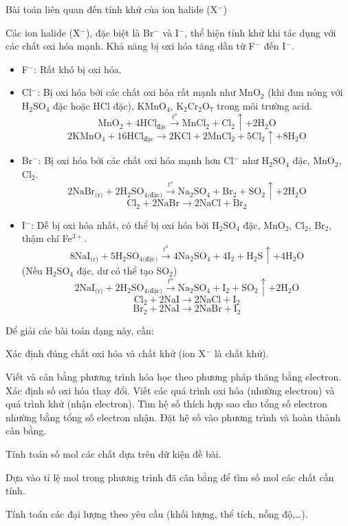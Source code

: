 \documentclass[Main.tex]{subfiles}
\begin{document}
 \begin{dang}{Bài toán liên quan đến tính khử của ion halide (X$^-$)}\end{dang}
   	\begin{phuongphap}
   		Các ion halide (X$^-$), đặc biệt là Br$^-$ và I$^-$, thể hiện tính khử khi tác dụng với các chất oxi hóa mạnh. Khả năng bị oxi hóa tăng dần từ F$^-$ đến I$^-$.
   		\begin{itemize}
   			\item F$^-$: Rất khó bị oxi hóa.
   			\item Cl$^-$: Bị oxi hóa bởi các chất oxi hóa rất mạnh như MnO$_2$ (khi đun nóng với H$_2$SO$_4$ đặc hoặc HCl đặc), KMnO$_4$, K$_2$Cr$_2$O$_7$ trong môi trường acid.
   			\[ \text{MnO}_2 + 4\text{HCl}_{\text{đặc}} \xrightarrow{t^o} \text{MnCl}_2 + \text{Cl}_2 \uparrow + 2\text{H}_2\text{O} \]
   			\[ 2\text{KMnO}_4 + 16\text{HCl}_{\text{đặc}} \rightarrow 2\text{KCl} + 2\text{MnCl}_2 + 5\text{Cl}_2 \uparrow + 8\text{H}_2\text{O} \]
   			\item Br$^-$: Bị oxi hóa bởi các chất oxi hóa mạnh hơn Cl$^-$ như H$_2$SO$_4$ đặc, MnO$_2$, Cl$_2$.
   			\[ 2\text{NaBr}_{\text{(r)}} + 2\text{H}_2\text{SO}_{4\text{(đặc)}} \xrightarrow{t^o} \text{Na}_2\text{SO}_4 + \text{Br}_2 + \text{SO}_2 \uparrow + 2\text{H}_2\text{O} \]
   			\[ \text{Cl}_2 + 2\text{NaBr} \rightarrow 2\text{NaCl} + \text{Br}_2 \]
   			\item I$^-$: Dễ bị oxi hóa nhất, có thể bị oxi hóa bởi H$_2$SO$_4$ đặc, MnO$_2$, Cl$_2$, Br$_2$, thậm chí Fe$^{3+}$.
   			\[ 8\text{NaI}_{\text{(r)}} + 5\text{H}_2\text{SO}_{4\text{(đặc)}} \xrightarrow{t^o} 4\text{Na}_2\text{SO}_4 + 4\text{I}_2 + \text{H}_2\text{S} \uparrow + 4\text{H}_2\text{O} \]
   			(Nếu H$_2$SO$_4$ đặc, dư có thể tạo SO$_2$)
   			\[ 2\text{NaI}_{\text{(r)}} + 2\text{H}_2\text{SO}_{4\text{(đặc)}} \xrightarrow{t^o} \text{Na}_2\text{SO}_4 + \text{I}_2 + \text{SO}_2 \uparrow + 2\text{H}_2\text{O} \]
   			\[ \text{Cl}_2 + 2\text{NaI} \rightarrow 2\text{NaCl} + \text{I}_2 \]
   			\[ \text{Br}_2 + 2\text{NaI} \rightarrow 2\text{NaBr} + \text{I}_2 \]
   		\end{itemize}
   		Để giải các bài toán dạng này, cần:
   		\begin{cacbuoc}
   			\item Xác định đúng chất oxi hóa và chất khử (ion X$^-$ là chất khử).
   			\item Viết và cân bằng phương trình hóa học theo phương pháp thăng bằng electron.
   			Xác định số oxi hóa thay đổi.
   			Viết các quá trình oxi hóa (nhường electron) và quá trình khử (nhận electron).
   			Tìm hệ số thích hợp sao cho tổng số electron nhường bằng tổng số electron nhận.
   			Đặt hệ số vào phương trình và hoàn thành cân bằng.
   			\item Tính toán số mol các chất dựa trên dữ kiện đề bài.
   			\item Dựa vào tỉ lệ mol trong phương trình đã cân bằng để tìm số mol các chất cần tính.
   			\item Tính toán các đại lượng theo yêu cầu (khối lượng, thể tích, nồng độ,\ldots).
   		\end{cacbuoc}
   	\end{phuongphap}
   	
\end{document}
